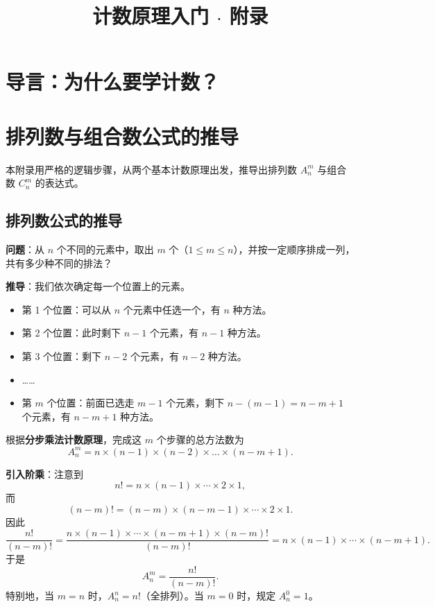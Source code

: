\documentclass[10pt]{article}
\title{计数原理入门 $\cdot$ 附录}
\author{}
\date{}
\begin{document}
\maketitle

\section{导言：为什么要学计数？}


\section{排列数与组合数公式的推导}

本附录用严格的逻辑步骤，从两个基本计数原理出发，推导出排列数 \(A_n^m\) 与组合数 \(C_n^m\) 的表达式。

\subsection{排列数公式的推导}

\textbf{问题}：从 \(n\) 个不同的元素中，取出 \(m\) 个（\(1 \le m \le n\)），并按一定顺序排成一列，共有多少种不同的排法？

\textbf{推导}：我们依次确定每一个位置上的元素。

\begin{itemize}
\item 第 1 个位置：可以从 \(n\) 个元素中任选一个，有 \(n\) 种方法。
\item 第 2 个位置：此时剩下 \(n-1\) 个元素，有 \(n-1\) 种方法。
\item 第 3 个位置：剩下 \(n-2\) 个元素，有 \(n-2\) 种方法。
\item ……
\item 第 \(m\) 个位置：前面已选走 \(m-1\) 个元素，剩下 \(n-(m-1) = n-m+1\) 个元素，有 \(n-m+1\) 种方法。
\end{itemize}

根据\textbf{分步乘法计数原理}，完成这 \(m\) 个步骤的总方法数为
\[
A_n^m = n \times (n-1) \times (n-2) \times \dots \times (n-m+1).
\]

\textbf{引入阶乘}：注意到
\[
n! = n \times (n-1) \times \cdots \times 2 \times 1,
\]
而
\[
(n-m)! = (n-m) \times (n-m-1) \times \cdots \times 2 \times 1.
\]
因此
\[
\frac{n!}{(n-m)!} = \frac{n \times (n-1) \times \cdots \times (n-m+1) \times (n-m)!}{(n-m)!} = n \times (n-1) \times \cdots \times (n-m+1).
\]
于是
\[
A_n^m = \frac{n!}{(n-m)!}.
\]
特别地，当 \(m=n\) 时，\(A_n^n = n!\)（全排列）。当 \(m=0\) 时，规定 \(A_n^0 = 1\)。
\end{document}
